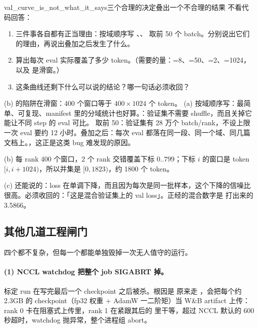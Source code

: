 \begin{checkpoint}{val_curve_is_not_what_it_says}{三个合理的决定叠出一个不合理的结果}
不看代码回答：
\begin{enumerate}[label=(\alph*)]
  \item 三件事各自都有正当理由：按域顺序写 、、 取前 50 个 batch。分别说出它们的理由，再说出叠加之后发生了什么。
  \item 算出每次 eval 实际覆盖了多少 token。（需要的量：=8、=50、=2、=1024，以及  是滑窗。）
  \item 这条曲线还剩下什么可以说的结论？哪一句话必须收回？
\end{enumerate}
\hint (b) 的陷阱在滑窗：400 个窗口等于 $400\times1024$ 个 token。
\ifshowanswers
\tcblower
\answer (a) 按域顺序写：最简单、可复现、manifest 里的分域统计也好算。：验证集不需要 shuffle，而且关掉它能让不同 step 的 eval 可比。 取前 50：验证集有 28 万个 batch/rank，不设上限一次 eval 要约 12 小时。叠加之后：每次 eval 都落在同一段、同一个域、同几篇文档上。，这正是这类 bug 难发现的原因。

(b) 每 rank 400 个窗口，2 个 rank 交错覆盖下标 $0..799$；下标 $i$ 的窗口是 token $[i, i+1024)$，所以并集是 $[0, 1823)$，约 1800 个 token。

(c) 还能说的：loss 在单调下降，而且因为每次是同一批样本，这个下降的信噪比很高。必须收回的：「这是混合验证集上的 val loss」。正经的混合数字是  打出来的 3.5866。
\whereincode {}
\fi
\end{checkpoint}

\subsection{其他几道工程闸门}
\label{subsec:gates}

四个都不复杂，但每一个都能单独毁掉一次无人值守的运行。

\paragraph{(1) NCCL watchdog 把整个 job SIGABRT 掉。}标定 run 在写完最后一个 checkpoint 之后被杀。根因是  原来走 ，会把每个约 2.3GB 的 checkpoint（fp32 权重 + AdamW 一二阶矩）当 W\&B artifact 上传：rank 0 卡在阻塞式上传里，rank 1 在紧跟其后的  里干等，超过 NCCL 默认的 600 秒超时，watchdog 抛异常，整个进程组 abort。

